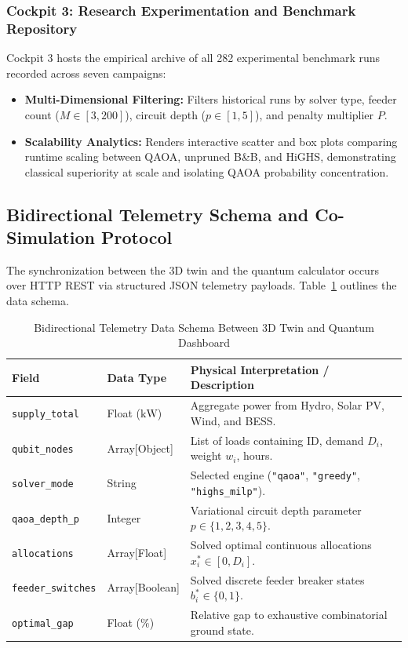\documentclass[11pt,a4paper]{article}
\theoremstyle{definition}
\theoremstyle{remark}
\begin{document}
\subsubsection{Cockpit 3: Research Experimentation and Benchmark Repository}
Cockpit 3 hosts the empirical archive of all 282 experimental benchmark runs recorded across seven campaigns:
\begin{itemize}
    \item \textbf{Multi-Dimensional Filtering:} Filters historical runs by solver type, feeder count ($M \in [3, 200]$), circuit depth ($p \in [1, 5]$), and penalty multiplier $P$.
    \item \textbf{Scalability Analytics:} Renders interactive scatter and box plots comparing runtime scaling between QAOA, unpruned B\&B, and HiGHS, demonstrating classical superiority at scale and isolating QAOA probability concentration.
\end{itemize}

\subsection{Bidirectional Telemetry Schema and Co-Simulation Protocol}
\label{subsec:telemetry_schema}

The synchronization between the 3D twin and the quantum calculator occurs over HTTP REST via structured JSON telemetry payloads. Table~\ref{tab:telemetry_schema} outlines the data schema.

\begin{table}[htbp]
\centering
\caption{Bidirectional Telemetry Data Schema Between 3D Twin and Quantum Dashboard}
\label{tab:telemetry_schema}
\renewcommand{\arraystretch}{1.2}
\begin{tabularx}{\columnwidth}{l l X}
\toprule
\textbf{Field} & \textbf{Data Type} & \textbf{Physical Interpretation / Description} \\
\midrule
\texttt{supply\_total} & Float ($\text{kW}$) & Aggregate power from Hydro, Solar PV, Wind, and BESS. \\
\texttt{qubit\_nodes} & Array[Object] & List of loads containing ID, demand $D_i$, weight $w_i$, hours. \\
\texttt{solver\_mode} & String & Selected engine (\texttt{"qaoa"}, \texttt{"greedy"}, \texttt{"highs\_milp"}). \\
\texttt{qaoa\_depth\_p} & Integer & Variational circuit depth parameter $p \in \{1, 2, 3, 4, 5\}$. \\
\texttt{allocations} & Array[Float] & Solved optimal continuous allocations $x_i^* \in [0, D_i]$. \\
\texttt{feeder\_switches} & Array[Boolean] & Solved discrete feeder breaker states $b_i^* \in \{0, 1\}$. \\
\texttt{optimal\_gap} & Float ($\%$) & Relative gap to exhaustive combinatorial ground state. \\
\bottomrule
\end{tabularx}
\end{table}
\end{document}

